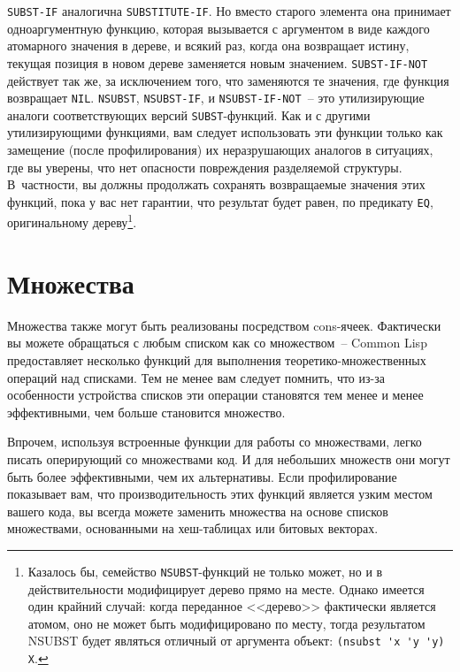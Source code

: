 \lstinline{SUBST-IF} аналогична \lstinline{SUBSTITUTE-IF}. Но вместо старого элемента она принимает
одноаргументную функцию, которая вызывается с аргументом в виде каждого атомарного
значения в дереве, и всякий раз, когда она возвращает истину, текущая позиция в новом
дереве заменяется новым значением. \lstinline{SUBST-IF-NOT} действует так же, за исключением
того, что заменяются те значения, где функция возвращает \lstinline{NIL}. \lstinline{NSUBST},
\lstinline{NSUBST-IF}, и \lstinline{NSUBST-IF-NOT}~-- это утилизирующие аналоги соответствующих
версий \lstinline{SUBST}-функций. Как и с другими утилизирующими функциями, вам следует
использовать эти функции только как замещение (после профилирования) их неразрушающих
аналогов в ситуациях, где вы уверены, что нет опасности повреждения разделяемой
структуры. В~частности, вы должны продолжать сохранять возвращаемые значения этих функций,
пока у вас нет гарантии, что результат будет равен, по предикату \lstinline{EQ}, оригинальному
дереву\footnote{Казалось бы, семейство \lstinline{NSUBST}-функций не только может, но и в
  действительности модифицирует дерево прямо на месте. Однако имеется один крайний случай:
  когда переданное <<дерево>> фактически является атомом, оно не может быть модифицировано
  по месту, тогда результатом NSUBST будет являться отличный от аргумента объект:
  \lstinline!(nsubst 'x 'y 'y) X!.}\hspace{\footnotenegspace}.

\section{Множества}

Множества также могут быть реализованы посредством cons-ячеек. Фактически вы можете
обращаться с любым списком как со множеством~-- Common Lisp предоставляет несколько функций
для выполнения теоретико-множественных операций над списками. Тем не менее вам следует
помнить, что из-за особенности устройства списков эти операции становятся тем менее и
менее эффективными, чем больше становится множество.

Впрочем, используя встроенные функции для работы со множествами, легко писать оперирующий со
множествами код. И для небольших множеств они могут быть более эффективными, чем их
альтернативы. Если профилирование показывает вам, что производительность этих функций
является узким местом вашего кода, вы всегда можете заменить множества на основе списков
множествами, основанными на хеш-таблицах или битовых векторах.

